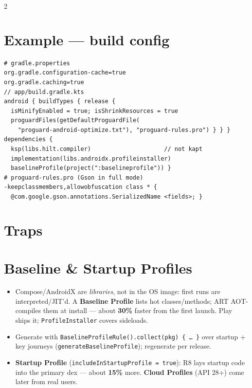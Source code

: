 \documentclass[8pt]{extarticle}
\begin{document}
\begin{multicols}{2}
\section{Example — build config}
\begin{lstlisting}[language=GradleSheet]
# gradle.properties
org.gradle.configuration-cache=true
org.gradle.caching=true
// app/build.gradle.kts
android { buildTypes { release {
  isMinifyEnabled = true; isShrinkResources = true
  proguardFiles(getDefaultProguardFile(
    "proguard-android-optimize.txt"), "proguard-rules.pro") } } }
dependencies {
  ksp(libs.hilt.compiler)                     // not kapt
  implementation(libs.androidx.profileinstaller)
  baselineProfile(project(":baselineprofile")) }
# proguard-rules.pro (Gson in full mode)
-keepclassmembers,allowobfuscation class * {
  @com.google.gson.annotations.SerializedName <fields>; }
\end{lstlisting}

\section{Traps}
\begin{itemize}\raggedright
\end{itemize}

\columnbreak

\section{Baseline \& Startup Profiles}
\begin{itemize}\raggedright
  \item Compose/AndroidX are \emph{libraries}, not in the OS image: first runs are
        interpreted/JIT'd. A \textbf{Baseline Profile} lists hot classes/methods; ART
        AOT-compiles them at install — about \textbf{30\%} faster from the first launch.
        Play ships it; \texttt{ProfileInstaller} covers sideloads.
  \item Generate with \texttt{BaselineProfileRule().collect(pkg) \{ … \}} over startup +
        key journeys (\texttt{generateBaselineProfile}); regenerate per release.
  \item \textbf{Startup Profile} (\texttt{includeInStartupProfile = true}): R8 lays startup
        code into the primary dex — about \textbf{15\%} more. \textbf{Cloud Profiles} (API
        28+) come later from real users.
\end{itemize}


\end{multicols}
\end{document}
